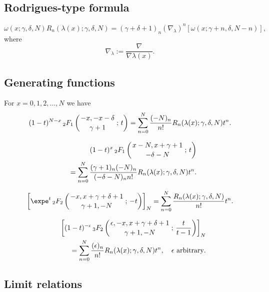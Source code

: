 \documentclass[envcountchap,graybox]{svmono}
\newcommand{\hyp}[5]{\mbox{}_{#1}{F}_{#2}
\left(\genfrac{}{}{0pt}{}{#3}{#4}\,;\,#5\right)}
\begin{document}
\newpage

\subsection*{Rodrigues-type formula}
\begin{equation}
\label{RodDualHahn}
\omega(x;\gamma,\delta,N)R_n(\lambda(x);\gamma,\delta,N)
=(\gamma+\delta+1)_n\left(\nabla_{\lambda}\right)^n\left[\omega(x;\gamma+n,\delta,N-n)\right],
\end{equation}
where
$$\nabla_{\lambda}:=\frac{\nabla}{\nabla\lambda(x)}.$$

\subsection*{Generating functions}
For $x=0,1,2,\ldots,N$ we have
\begin{equation}
\label{GenDualHahn1}
(1-t)^{N-x}\,\hyp{2}{1}{-x,-x-\delta}{\gamma+1}{t}
=\sum_{n=0}^N\frac{(-N)_n}{n!}R_n(\lambda(x);\gamma,\delta,N)t^n.
\end{equation}

\begin{eqnarray}
\label{GenDualHahn2}
& &(1-t)^x\,\hyp{2}{1}{x-N,x+\gamma+1}{-\delta-N}{t}\nonumber\\
& &=\sum_{n=0}^N\frac{(\gamma+1)_n(-N)_n}{(-\delta-N)_nn!}R_n(\lambda(x);\gamma,\delta,N)t^n.
\end{eqnarray}

\begin{equation}
\label{GenDualHahn3}
\left[\expe^t\,\hyp{2}{2}{-x,x+\gamma+\delta+1}{\gamma+1,-N}{-t}\right]_N=\sum_{n=0}^N
\frac{R_n(\lambda(x);\gamma,\delta,N)}{n!}t^n.
\end{equation}

\begin{eqnarray}
\label{GenDualHahn4}
& &\left[(1-t)^{-\epsilon}\,\hyp{3}{2}{\epsilon,-x,x+\gamma+\delta+1}{\gamma+1,-N}{\frac{t}{t-1}}\right]_N\nonumber\\
& &{}=\sum_{n=0}^N\frac{(\epsilon)_n}{n!}R_n(\lambda(x);\gamma,\delta,N)t^n,
\quad\textrm{$\epsilon$ arbitrary}.
\end{eqnarray}

\subsection*{Limit relations}
\end{document}
